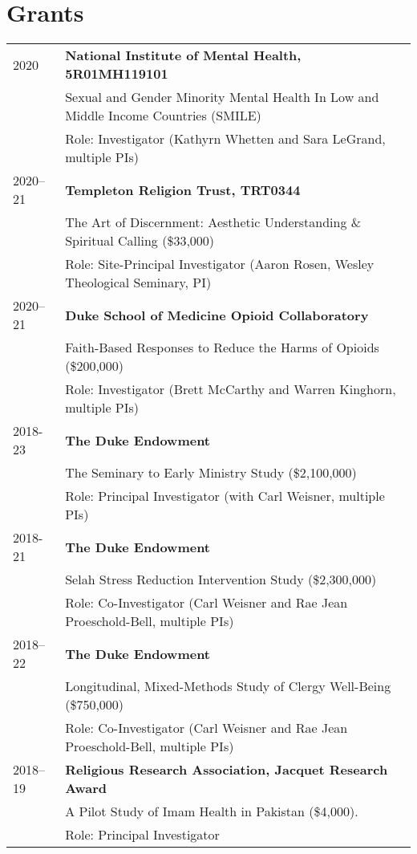 \section*{Grants}
\begin{longtable}{p{} p{}}
2020 & \textbf{National Institute of Mental Health, 5R01MH119101} \\
& Sexual and Gender Minority Mental Health In Low and Middle Income Countries (SMILE) \\
& Role: Investigator (Kathyrn Whetten and Sara LeGrand, multiple PIs)\\

2020--21 & \textbf{Templeton Religion Trust, TRT0344} \\
& The Art of Discernment: Aesthetic Understanding \& Spiritual Calling (\$33,000)\\
& Role: Site-Principal Investigator (Aaron Rosen, Wesley Theological Seminary, PI)\\

2020--21 & \textbf{Duke School of Medicine Opioid Collaboratory}\\
& Faith-Based Responses to Reduce the Harms of Opioids (\$200,000) \\
& Role: Investigator (Brett McCarthy and Warren Kinghorn, multiple PIs)\\

2018-23 & \textbf{The Duke Endowment}\\
& The Seminary to Early Ministry Study (\$2,100,000)\\
& Role: Principal Investigator (with Carl Weisner, multiple PIs)\\
\vspace{.2em}
2018-21 & \textbf{The Duke Endowment}\\
& Selah Stress Reduction Intervention Study (\$2,300,000)\\
& Role: Co-Investigator (Carl Weisner and Rae Jean Proeschold-Bell, multiple PIs)\\

2018--22 & \textbf{The Duke Endowment}\\
& Longitudinal, Mixed-Methods Study of Clergy Well-Being (\$750,000)\\
& Role: Co-Investigator (Carl Weisner and Rae Jean Proeschold-Bell, multiple PIs)\\

2018--19 & \textbf{Religious Research Association, Jacquet Research Award}\\
& A Pilot Study of Imam Health in Pakistan (\$4,000). \\
& Role: Principal Investigator\\


\end{longtable}
